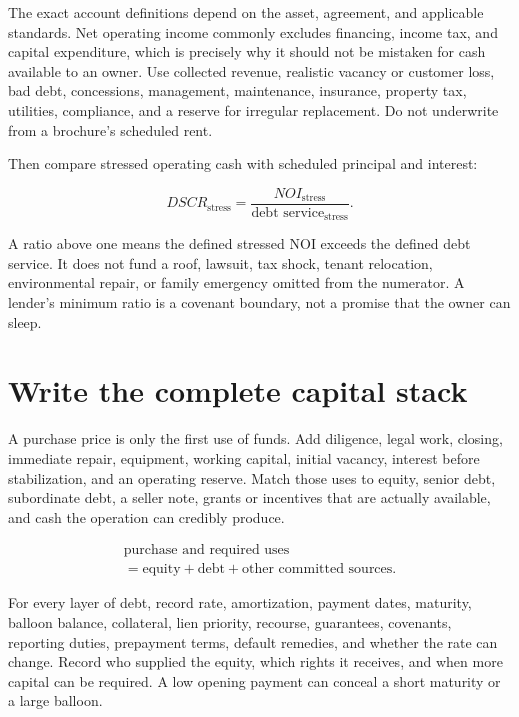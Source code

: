 The exact account definitions depend on the asset, agreement, and applicable
standards. Net operating income commonly excludes financing, income tax, and
capital expenditure, which is precisely why it should not be mistaken for cash
available to an owner. Use collected revenue, realistic vacancy or customer
loss, bad debt, concessions, management, maintenance, insurance, property tax,
utilities, compliance, and a reserve for irregular replacement. Do not
underwrite from a brochure's scheduled rent.

Then compare stressed operating cash with scheduled principal and interest:

\begin{equation}
DSCR_{\mathrm{stress}}
  =\frac{NOI_{\mathrm{stress}}}
         {\text{debt service}_{\mathrm{stress}}}.
\end{equation}

A ratio above one means the defined stressed NOI exceeds the defined debt
service. It does not fund a roof, lawsuit, tax shock, tenant relocation,
environmental repair, or family emergency omitted from the numerator. A
lender's minimum ratio is a covenant boundary, not a promise that the owner can
sleep.

\section{Write the complete capital stack}

A purchase price is only the first use of funds. Add diligence, legal work,
closing, immediate repair, equipment, working capital, initial vacancy,
interest before stabilization, and an operating reserve. Match those uses to
equity, senior debt, subordinate debt, a seller note, grants or incentives that
are actually available, and cash the operation can credibly produce.

\begin{equation}
\begin{gathered}
\text{purchase and required uses}\\
=\text{equity}+\text{debt}+\text{other committed sources}.
\end{gathered}
\end{equation}

For every layer of debt, record rate, amortization, payment dates, maturity,
balloon balance, collateral, lien priority, recourse, guarantees, covenants,
reporting duties, prepayment terms, default remedies, and whether the rate can
change. Record who supplied the equity, which rights it receives, and when more
capital can be required. A low opening payment can conceal a short maturity or
a large balloon.

